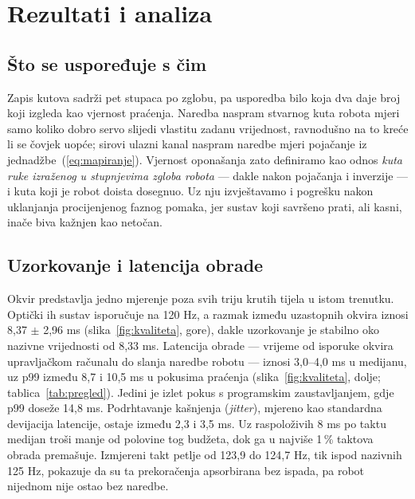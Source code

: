 \section{Rezultati i analiza}
\label{sec:rezultati}

\subsection{Što se uspoređuje s čim}

Zapis kutova sadrži pet stupaca po zglobu, pa usporedba bilo koja dva daje broj
koji izgleda kao vjernost praćenja. Naredba naspram stvarnog kuta robota mjeri
samo koliko dobro servo slijedi vlastitu zadanu vrijednost, ravnodušno na to
kreće li se čovjek uopće; sirovi ulazni kanal naspram naredbe mjeri pojačanje iz
jednadžbe~(\ref{eq:mapiranje}). Vjernost oponašanja zato definiramo kao odnos
\emph{kuta ruke izraženog u stupnjevima zgloba robota} --- dakle nakon pojačanja
i inverzije --- i kuta koji je robot doista dosegnuo. Uz nju izvještavamo i
pogrešku nakon uklanjanja procijenjenog faznog pomaka, jer sustav koji savršeno
prati, ali kasni, inače biva kažnjen kao netočan.

\subsection{Uzorkovanje i latencija obrade}

Okvir predstavlja jedno mjerenje poza svih triju krutih tijela u istom trenutku. Optički
ih sustav isporučuje na 120 Hz, a razmak između uzastopnih okvira iznosi
8,37 $\pm$ 2,96 ms (slika~\ref{fig:kvaliteta}, gore), dakle uzorkovanje je stabilno
oko nazivne vrijednosti od 8,33 ms. Latencija obrade --- vrijeme od isporuke
okvira upravljačkom računalu do slanja naredbe robotu --- iznosi 3,0--4,0 ms u
medijanu, uz p99 između 8,7 i 10,5 ms u pokusima praćenja
(slika~\ref{fig:kvaliteta}, dolje; tablica~\ref{tab:pregled}). Jedini je izlet pokus s
programskim zaustavljanjem, gdje p99 doseže 14,8 ms. Podrhtavanje kašnjenja
(\emph{jitter}), mjereno kao standardna devijacija latencije, ostaje između 2,3
i 3,5 ms. Uz raspoloživih 8 ms po taktu medijan troši manje od polovine tog budžeta,
dok ga u najviše 1\,\% taktova obrada premašuje. Izmjereni takt petlje od 123,9 do 124,7 Hz, tik
ispod nazivnih 125 Hz, pokazuje da su ta prekoračenja apsorbirana bez ispada, pa robot nijednom
nije ostao bez naredbe.

